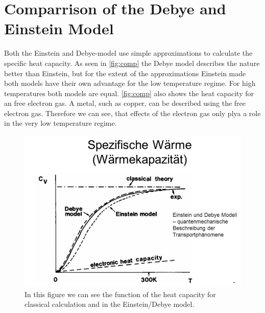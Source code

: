 \section{Comparrison of the Debye and Einstein Model}
\label{sec:comp_DE}
Both the Einstein and Debye-model use simple approximations to calculate the specific heat capacity. As seen in \autoref{fig:comp} the Debye model describes the nature better than Einstein, 
but for the extent of the approximations Einstein made both models have their own advantage for the low temperature regime. For high temperatures both models are equal. \autoref{fig:comp}
also shows the heat capacity for an free electron gas. A metal, such as copper, can be described using the free electron gas. Therefore we can see, that effects of the electron gas 
only plya a role in the very low temperature regime.
\begin{figure}
    \centering
    \includegraphics[scale=0.4]{content/V47_pictures/comp.PNG}
    \caption{In this figure we can see the function of the heat capacity for classical calculation and in the Einstein/Debye model.}
    \label{fig:comp}
\end{figure}